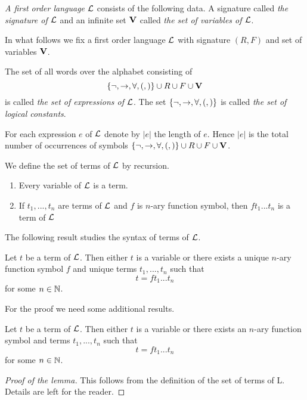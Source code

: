 \begin{definition}
\textit{A first order language ${\mathcal L}$} consists of the following data. A signature called \textit{the signature of ${\mathcal L}$} and an infinite set $\mathbf{V}$ called \textit{the set of variables of ${\mathcal L}$}.
\end{definition}
\noindent
In what follows we fix a first order language ${\mathcal L}$ with signature $(R,F)$ and set of variables $\mathbf{V}$.

\begin{definition}
The set of all words over the alphabet consisting of
$$\{\neg, \rightarrow, \forall, (, )\} \cup R \cup F \cup \mathbf{V}$$
is called \textit{the set of expressions of ${\mathcal L}$}. The set $\{\neg, \rightarrow, \forall, (, )\}$ is called \textit{the set of logical constants}.
\end{definition}
\noindent
For each expression $e$ of ${\mathcal L}$ denote by $|e|$ the length of $e$. Hence $|e|$ is the total number of occurrences of symbols $\{\neg, \rightarrow, \forall, (, )\} \cup R \cup F \cup \mathbf{V}$.

\begin{definition}
We define the set of terms of ${\mathcal L}$ by recursion.
\begin{enumerate}[label=\textbf{(\arabic*)}, leftmargin=3.0em]
\item Every variable of ${\mathcal L}$ is a term.
\item If $t_1,...,t_n$ are terms of ${\mathcal L}$ and $f$ is $n$-ary function symbol, then $ft_1...t_n$ is a term of ${\mathcal L}$
\end{enumerate}
\end{definition}
\noindent
The following result studies the syntax of terms of ${\mathcal L}$.

\begin{theorem}\label{theorem:unique_readebility_of_terms}
Let $t$ be a term of ${\mathcal L}$. Then either $t$ is a variable or there exists a unique $n$-ary function symbol $f$ and unique terms $t_1,...,t_n$ such that
$$t = ft_1...t_n$$
for some $n \in {\mathbb N}$.
\end{theorem}
\noindent
For the proof we need some additional results.

\begin{lemma}\label{lemma:term_presentation}
Let $t$ be a term of ${\mathcal L}$. Then either $t$ is a variable or there exists an $n$-ary function symbol
and terms $t_1,...,t_n$ such that
$$t = ft_1...t_n$$
for some $n\in{\mathbb N}$.
\end{lemma}
\begin{proof}[Proof of the lemma]
This follows from the definition of the set of terms of L. Details are left for the
reader.
\end{proof}

